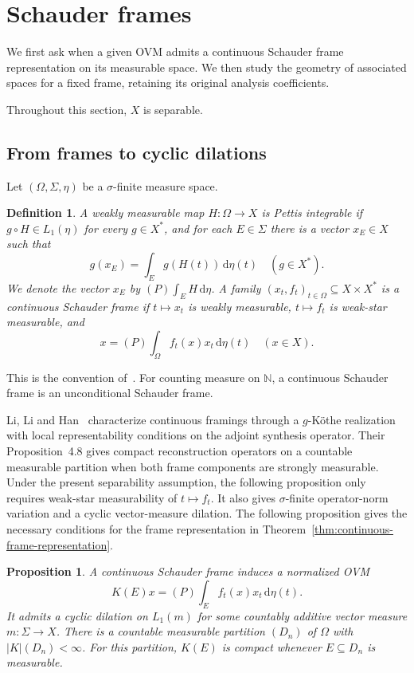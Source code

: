 \documentclass[11pt,leqno]{amsart}
\theoremstyle{compact}
\numberwithin{equation}{section}
\newtheorem{proposition}[theorem]{Proposition}
\newtheorem{definition}[theorem]{Definition}
\theoremstyle{compactremark}
\theoremstyle{compact}
\newcommand{\1}{\mathbbm{1}}
\newcommand{\rmd}{\mathrm{d}}
\newcommand{\N}{\mathbb{N}}
\newcommand{\abs}[1]{\left|#1\right|}
\begin{document}
\section{Schauder frames}\label{sec:frames}

We first ask when a given OVM admits a continuous Schauder frame representation on its measurable space. We then study the geometry of associated spaces for a fixed frame, retaining its original analysis coefficients.

Throughout this section, $X$ is separable.

\subsection{From frames to cyclic dilations}

Let $(\Omega,\Sigma,\eta)$ be a $\sigma$-finite measure space.

\begin{definition}
A weakly measurable map $H\colon\Omega\to X$ is \emph{Pettis integrable} if $g\circ H\in L_1(\eta)$ for every $g\in X^*$, and for each $E\in\Sigma$ there is a vector $x_E\in X$ such that
\[
g(x_E)=\int_Eg(H(t))\,\rmd\eta(t)\quad(g\in X^*).
\]
We denote the vector $x_E$ by $(P)\!\int_EH\,\rmd\eta$. A family $(x_t,f_t)_{t\in\Omega}\subseteq X\times X^*$ is a \emph{continuous Schauder frame} if $t\mapsto x_t$ is weakly measurable, $t\mapsto f_t$ is weak-star measurable, and
\[
x=(P)\!\int_\Omega f_t(x)x_t\,\rmd\eta(t)\quad(x\in X).
\]
\end{definition}

This is the convention of~\cite[Definitions~2.2 and~2.3]{EisnerFreeman2020}. For counting measure on $\N$, a continuous Schauder frame is an unconditional Schauder frame.

Li, Li and Han~\cite[Theorem~4.3]{LiLiHan2016} characterize continuous framings through a $g$-K\"othe realization with local representability conditions on the adjoint synthesis operator. Their Proposition~4.8 gives compact reconstruction operators on a countable measurable partition when both frame components are strongly measurable. Under the present separability assumption, the following proposition only requires weak-star measurability of $t\mapsto f_t$. It also gives $\sigma$-finite operator-norm variation and a cyclic vector-measure dilation. The following proposition gives the necessary conditions for the frame representation in Theorem~\ref{thm:continuous-frame-representation}.

\begingroup
\begin{proposition}\label{prop:frame-dilation}
A continuous Schauder frame induces a normalized OVM
\[
K(E)x=(P)\!\int_E f_t(x)x_t\,\rmd\eta(t).
\]
It admits a cyclic dilation on $L_1(m)$ for some countably additive vector measure $m\colon\Sigma\to X$. There is a countable measurable partition $(D_n)$ of $\Omega$ with $\abs{K}(D_n)<\infty$. For this partition, $K(E)$ is compact whenever $E\subseteq D_n$ is measurable.
\end{proposition}
\endgroup
\end{document}
